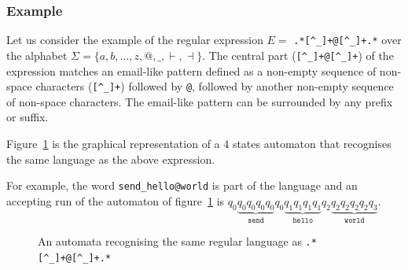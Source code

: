 \documentclass[12px]{article}
\theoremstyle{definition}
\begin{document}
      \subsubsection{Example}%

        \label{sec:example_simple}

        Let us consider the example of the regular expression $E =$
        \texttt{.*[\textasciicircum\_]+@[\textasciicircum\_]+.*} over the
        alphabet $\Sigma = \{a, b, \ldots, z, @, \texttt \_, \vdash, \dashv\}$.
        The central part (\texttt{[\textasciicircum\_]+@[\textasciicircum\_]+})
        of the expression matches an email-like pattern defined as a non-empty
        sequence of non-space characters (\texttt{[\textasciicircum\_]+})
        followed by \texttt{@}, followed by another non-empty sequence of
        non-space characters. The email-like pattern can be surrounded by any
        prefix or suffix.

        Figure~\ref{fig:automata_simple} is the graphical representation of a 4
        states automaton that recognises the same language as the above
        expression.

        For example, the word \texttt{send\_hello@world} is part of the
        language and an accepting run of the automaton of
        figure~\ref{fig:automata_simple} is $q_0 \underbrace{q_0 q_0 q_0
        q_0}_\texttt{send} q_0 \underbrace{q_1q_1q_1q_1}_\texttt{hello} q_2
        \underbrace{q_2 q_2 q_2 q_2 q_3}_\texttt{world}$.

        \begin{figure}[ht]%
          \label{fig:automata_simple}
          \centering
          \caption{An automata recognising the same regular language as
          \texttt{.*[\textasciicircum\_]+@[\textasciicircum\_]+.*}}
        \end{figure}
\end{document}
